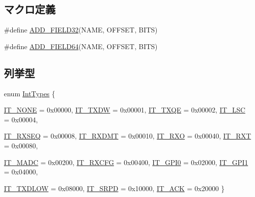 \subsection*{マクロ定義}
\begin{DoxyCompactItemize}
\item 
\#define \hyperlink{i8254xGBe__defs_8hh_a7a3144e348db866b82200668c4a308d0}{ADD\_\-FIELD32}(NAME, OFFSET, BITS)
\item 
\#define \hyperlink{i8254xGBe__defs_8hh_adbdb4bcfd1b192160a725f18d78eb920}{ADD\_\-FIELD64}(NAME, OFFSET, BITS)
\end{DoxyCompactItemize}
\subsection*{列挙型}
\begin{DoxyCompactItemize}
\item 
enum \hyperlink{namespaceiGbReg_ab881f740bd3545d8eb42b05253752e9c}{IntTypes} \{ \par
\hyperlink{namespaceiGbReg_ab881f740bd3545d8eb42b05253752e9ca58e0db566cc170509a2e6cd9ecb6f643}{IT\_\-NONE} =  0x00000, 
\hyperlink{namespaceiGbReg_ab881f740bd3545d8eb42b05253752e9ca41242befdd855ef8192a0cad76e34a02}{IT\_\-TXDW} =  0x00001, 
\hyperlink{namespaceiGbReg_ab881f740bd3545d8eb42b05253752e9ca8970dcbfb859f26bfa07a586377d4455}{IT\_\-TXQE} =  0x00002, 
\hyperlink{namespaceiGbReg_ab881f740bd3545d8eb42b05253752e9ca9efb1a53e1557fd509318a197e3a0bc4}{IT\_\-LSC} =  0x00004, 
\par
\hyperlink{namespaceiGbReg_ab881f740bd3545d8eb42b05253752e9ca54659029c768bd858f1a6d33065e3925}{IT\_\-RXSEQ} =  0x00008, 
\hyperlink{namespaceiGbReg_ab881f740bd3545d8eb42b05253752e9ca74eadde240fb76053a8cd4776d9e39be}{IT\_\-RXDMT} =  0x00010, 
\hyperlink{namespaceiGbReg_ab881f740bd3545d8eb42b05253752e9ca235c7e40a1a2784ddb5740f5a4a85eba}{IT\_\-RXO} =  0x00040, 
\hyperlink{namespaceiGbReg_ab881f740bd3545d8eb42b05253752e9ca5de08c161325e1127c2727a0b234f9b3}{IT\_\-RXT} =  0x00080, 
\par
\hyperlink{namespaceiGbReg_ab881f740bd3545d8eb42b05253752e9ca011fe30216c5a9a8b0692d8a1b41ae34}{IT\_\-MADC} =  0x00200, 
\hyperlink{namespaceiGbReg_ab881f740bd3545d8eb42b05253752e9ca193606c00b9e4a2aab4b2e9acadd5a22}{IT\_\-RXCFG} =  0x00400, 
\hyperlink{namespaceiGbReg_ab881f740bd3545d8eb42b05253752e9cadde7414df8f2baf097108dd15a031af9}{IT\_\-GPI0} =  0x02000, 
\hyperlink{namespaceiGbReg_ab881f740bd3545d8eb42b05253752e9cad8ea3d9d603aae5a5f65ae850ebd1491}{IT\_\-GPI1} =  0x04000, 
\par
\hyperlink{namespaceiGbReg_ab881f740bd3545d8eb42b05253752e9ca3bf746c26536ce7825047a493b1f1485}{IT\_\-TXDLOW} =  0x08000, 
\hyperlink{namespaceiGbReg_ab881f740bd3545d8eb42b05253752e9ca72e21e36635d99d0b77bd21cd52a4815}{IT\_\-SRPD} =  0x10000, 
\hyperlink{namespaceiGbReg_ab881f740bd3545d8eb42b05253752e9ca70a1f84a3694d89a9950f0aac28d198a}{IT\_\-ACK} =  0x20000
 \}
\end{DoxyCompactItemize}
